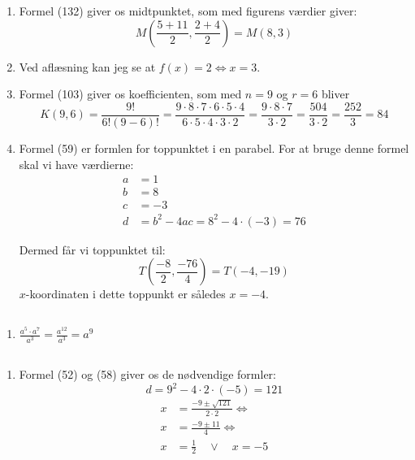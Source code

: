 \documentclass[10pt,a4paper,table]{article}
\begin{document}
\thispagestyle{plain}

\section{}
\subsection{}
\begin{enumerate}
  \item Formel (132) giver os midtpunktet, som med figurens værdier giver:
    $$M\left(\frac{5+11}{2},\frac{2+4}{2}\right)=M\left(8,3\right)$$
  \item Ved aflæsning kan jeg se at $f(x)=2 \Leftrightarrow x=3$.
  \item Formel (103) giver os koefficienten, som med $n=9$ og $r=6$ bliver
    $$K(9,6)=\frac{9!}{6!(9-6)!}=\frac{9\cdot 8\cdot 7\cdot 6\cdot 5\cdot 4}{6\cdot 5\cdot 4\cdot 3\cdot 2}=\frac{9\cdot 8\cdot 7}{3\cdot 2}=\frac{504}{3\cdot 2}=\frac{252}{3}=84$$
  \item Formel (59) er formlen for toppunktet i en parabel. For at bruge denne formel skal vi have værdierne:
    \begin{align*}
      a&=1\\
      b&=8\\
      c&=-3\\
      d&=b^2-4ac=8^2-4\cdot(-3)=76
    \end{align*}

    Dermed får vi toppunktet til:
    $$T\left(\frac{-8}{2},\frac{-76}{4}\right)=T(-4,-19)$$
    $x$-koordinaten i dette toppunkt er således $x=-4$.
\end{enumerate}

\subsection{}
\begin{enumerate}
  \item $\frac{a^5\cdot a^7}{a^3}=\frac{a^{12}}{a^3}=a^9$
\end{enumerate}

\subsection{}
\begin{enumerate}
  \item Formel (52) og (58) giver os de nødvendige formler:
    $$d=9^2-4\cdot 2\cdot (-5)=121$$
    \begin{align*}
      x&=\frac{-9\pm\sqrt{121}}{2\cdot2} \Leftrightarrow\\
      x&=\frac{-9\pm 11}{4}\Leftrightarrow\\
      x&=\tfrac12 \quad \lor \quad x=-5
    \end{align*}
\end{enumerate}
\end{document}
